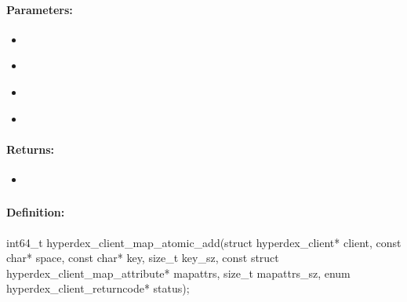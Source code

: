 \paragraph{Parameters:}
\begin{itemize}[noitemsep]
\item {}\\

\item {}\\

\item {}\\

\item {}\\

\end{itemize}

\paragraph{Returns:}
\begin{itemize}[noitemsep]
\item {}\\

\end{itemize}

\pagebreak
\subsubsection{}
\label{api:c:map_atomic_add}


\paragraph{Definition:}
\begin{ccode}
int64_t hyperdex_client_map_atomic_add(struct hyperdex_client* client,
        const char* space,
        const char* key, size_t key_sz,
        const struct hyperdex_client_map_attribute* mapattrs, size_t mapattrs_sz,
        enum hyperdex_client_returncode* status);
\end{ccode}

